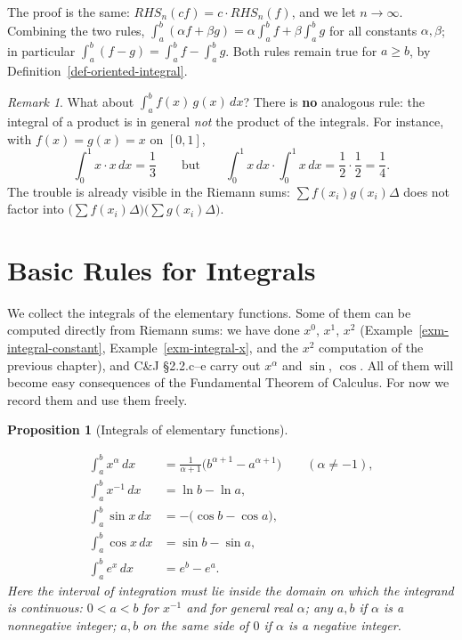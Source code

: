 \documentclass[
  letterpaper,
  DIV=11,
  numbers=noendperiod]{scrreprt}
\theoremstyle{plain}
\theoremstyle{plain}
\newtheorem{proposition}{Proposition}[chapter]
\theoremstyle{definition}
\theoremstyle{definition}
\theoremstyle{definition}
\theoremstyle{plain}
\theoremstyle{plain}
\theoremstyle{remark}
\newtheorem{refremark}{Remark}[chapter]
\begin{document}
The proof is the same: \(RHS_n(cf) = c\cdot RHS_n(f)\), and we let
\(n\to\infty\). Combining the two rules,
\(\int_a^b(\alpha f + \beta g) = \alpha\int_a^b f + \beta\int_a^b g\)
for all constants \(\alpha,\beta\); in particular
\(\int_a^b (f-g) = \int_a^b f - \int_a^b g\). Both rules remain true for
\(a\ge b\), by Definition~\ref{def-oriented-integral}.

\begin{refremark}
What about \(\int_a^b f(x)\,g(x)\,dx\)? There is \textbf{no} analogous
rule: the integral of a product is in general \emph{not} the product of
the integrals. For instance, with \(f(x)=g(x)=x\) on \([0,1]\), \[
\int_0^1 x\cdot x\,dx = \frac13
\qquad\text{but}\qquad
\int_0^1 x\,dx\cdot\int_0^1 x\,dx = \frac12\cdot\frac12 = \frac14 .
\] The trouble is already visible in the Riemann sums:
\(\sum f(x_i)g(x_i)\Delta\) does not factor into
\(\big(\sum f(x_i)\Delta\big)\big(\sum g(x_i)\Delta\big)\).

\label{rem-no-product-rule}

\end{refremark}

\section{Basic Rules for Integrals}\label{basic-rules-for-integrals}

We collect the integrals of the elementary functions. Some of them can
be computed directly from Riemann sums: we have done \(x^0\), \(x^1\),
\(x^2\) (Example~\ref{exm-integral-constant},
Example~\ref{exm-integral-x}, and the \(x^2\) computation of the
previous chapter), and C\&J §2.2.c--e carry out \(x^\alpha\) and
\(\sin\), \(\cos\). All of them will become easy consequences of the
Fundamental Theorem of Calculus. For now we record them and use them
freely.

\begin{proposition}[Integrals of elementary
functions]\protect\hypertarget{prp-basic-integrals}{}\label{prp-basic-integrals}

\[
\begin{aligned}
\int_a^b x^\alpha\,dx &= \frac{1}{\alpha+1}\big(b^{\alpha+1}-a^{\alpha+1}\big) \qquad (\alpha\neq-1), \\
\int_a^b x^{-1}\,dx &= \ln b - \ln a, \\
\int_a^b \sin x\,dx &= -\big(\cos b - \cos a\big), \\
\int_a^b \cos x\,dx &= \sin b - \sin a, \\
\int_a^b e^x\,dx &= e^b - e^a .
\end{aligned}
\] Here the interval of integration must lie inside the domain on which
the integrand is continuous: \(0<a<b\) for \(x^{-1}\) and for general
real \(\alpha\); any \(a,b\) if \(\alpha\) is a nonnegative integer;
\(a,b\) on the same side of \(0\) if \(\alpha\) is a negative integer.

\end{proposition}
\end{document}
